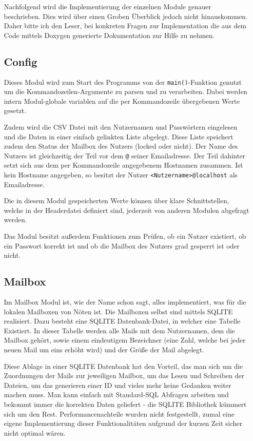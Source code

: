 \documentclass[final,a4paper,11pt,notitlepage,halfparskip]{scrreprt}
\begin{document}
Nachfolgend wird die Implementierung der einzelnen Module genauer beschrieben.
Dies wird über einen Groben Überblick jedoch nicht hinauskommen. Daher bitte ich
den Leser, bei konkreten Fragen zur Implementation die aus dem Code mittels
Doxygen generierte Dokumentation zur Hilfe zu nehmen. 


\subsection{Config}
Dieses Modul wird zum Start des Programms von der \texttt{main()}-Funktion
genutzt um die Kommandozeilen-Argumente zu parsen und zu verarbeiten. Dabei
werden intern Modul-globale variablen auf die per Kommandozeile übergebenen
Werte gesetzt. 

Zudem wird die CSV Datei mit den Nutzernamen und Passwörtern eingelesen und die
Daten in einer einfach gelinkten Liste abgelegt. Diese Liste speichert zudem den
Status der Mailbox des Nutzers (locked oder nicht). Der Name des Nutzers ist
gleichzeitig der Teil vor dem \texttt{@} seiner Emailadresse. Der Teil dahinter
setzt sich aus dem per Kommandozeile angegebenem Hostnamen zusammen. Ist kein
Hostname angegeben, so besitzt der Nutzer \texttt{<Nutzername>@localhost} als
Emailadresse.

Die in diesem Modul gespeicherten Werte können über klare Schnittstellen, welche
in der Headerdatei definiert sind, jederzeit von anderen Modulen abgefragt
werden.

Das Modul besitzt außerdem Funktionen zum Prüfen, ob ein Nutzer existiert, ob
ein Passwort korrekt ist und ob die Mailbox des Nutzers grad gesperrt ist oder
nicht.


\subsection{Mailbox}
Im Mailbox Modul ist, wie der Name schon sagt, alles implementiert, was für die
lokalen Mailboxen von Nöten ist. Die Mailboxen selbst sind mittels SQLITE
realisiert. Dazu besteht eine SQLITE Datenbank-Datei, in welcher eine Tabelle
Existiert. In dieser Tabelle werden alle Mails mit dem Nutzernamen, dem die
Mailbox gehört, sowie einem eindeutigem Bezeichner (eine Zahl, welche bei jeder
neuen Mail um eins erhöht wird) und der Größe der Mail abgelegt.

Diese Ablage in einer SQLITE Datenbank hat den Vorteil, das man sich um die
Zuordnungen der Mails zur jeweiligen Mailbox, um das Lesen und Schreiben der
Dateien, um das generieren einer ID und vieles mehr keine Gedanken weiter machen
muss. Man kann einfach mit Standard-SQL Abfragen arbeiten und bekommt immer die
korrekten Daten geliefert - die SQLITE Bibliothek kümmert sich um den Rest.
Performancenachteile wurden nicht festgestellt, zumal eine eigene
Implementierung dieser Funktionalitäten aufgrund der kurzen Zeit sicher nicht
optimal wären.
\end{document}
